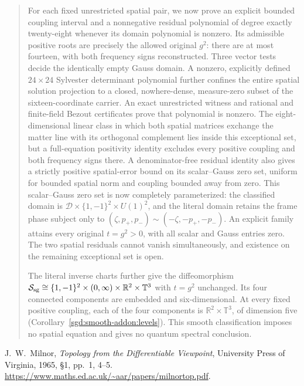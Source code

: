 \documentclass[11pt]{article}
\begin{document}
\begin{abstract}
For each fixed unrestricted spatial pair, we now prove an explicit
bounded coupling interval and a nonnegative residual polynomial of
degree exactly twenty-eight whenever its domain polynomial is nonzero.
Its admissible positive roots are precisely the allowed original $g^2$:
there are at most fourteen, with both frequency signs reconstructed.
Three vector tests decide the identically empty Gauss domain.
A nonzero, explicitly defined $24\times24$ Sylvester determinant
polynomial further confines the entire spatial solution projection to
a closed, nowhere-dense, measure-zero subset of the sixteen-coordinate
carrier. An exact unrestricted witness and rational and finite-field
Bezout certificates prove that polynomial is nonzero. The eight-dimensional linear class in which both spatial matrices
exchange the matter line with its orthogonal complement lies inside this
exceptional set, but a full-equation positivity identity excludes every
positive coupling and both frequency signs there. A denominator-free
residual identity also gives a strictly positive spatial-error bound on
its scalar--Gauss zero set, uniform for bounded spatial norm and coupling
bounded away from zero. This scalar--Gauss zero set is now completely
parameterized: the classified domain is
$\mathcal D\times\{1,-1\}^2\times U(1)^2$, and the literal domain
retains the frame phase subject only to
$(\zeta,p_+,p_-)\sim(-\zeta,-p_+,-p_-)$.
An explicit family attains every original $t=g^2>0$, with all scalar
and Gauss entries zero. The two spatial residuals cannot vanish simultaneously, and
existence on the remaining exceptional set is open.

The literal inverse charts further give the diffeomorphism
$\mathcal S_{\rm sg}\cong\{1,-1\}^2\times(0,\infty)
\times\mathbb R^2\times\mathbb T^3$ with $t=g^2$ unchanged.
Its four connected components are embedded and six-dimensional.
At every fixed positive coupling, each of the four components is
$\mathbb R^2\times\mathbb T^3$, of dimension five
(Corollary~\ref{sgd:smooth-addon:levels}). This smooth classification
imposes no spatial equation and gives no quantum spectral conclusion.

\end{abstract}

\begin{thebibliography}{9}
J.~W.~Milnor, \emph{Topology from the Differentiable Viewpoint},
University Press of Virginia, 1965, \S1, pp.~1, 4--5.
\url{https://www.maths.ed.ac.uk/~aar/papers/milnortop.pdf}.
\end{thebibliography}
\end{document}
